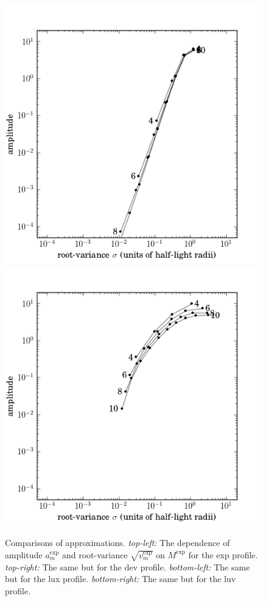 \documentclass[12pt,pdftex,preprint]{aastex}
\newlength{\figurewidth}
\begin{document}
\begin{figure}
\includegraphics[width=\figurewidth]{mixtures_vs_K_lux.png}%
\includegraphics[width=\figurewidth]{mixtures_vs_K_luv.png}
\caption{Comparisons of approximations.  \textsl{top-left:} The
  dependence of amplitude $a^{\exp}_m$ and root-variance
  $\sqrt{v^{\exp}_m}$ on $M^{\exp}$ for the exp profile.
  \textsl{top-right:} The same but for the dev profile.
  \textsl{bottom-left:} The same but for the lux profile.
  \textsl{bottom-right:} The same but for the luv profile.}
\end{figure}
\end{document}
